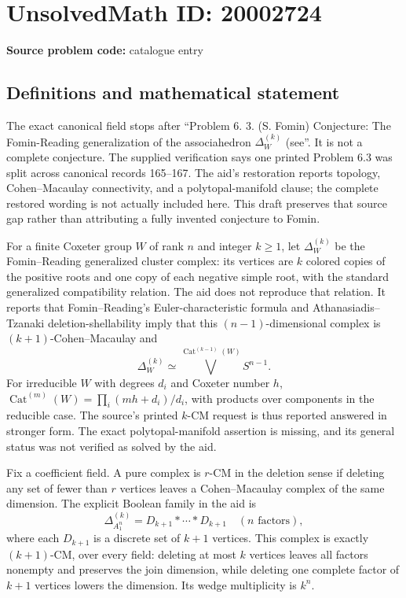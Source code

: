 \documentclass[11pt]{article}
\begin{document}
\section*{UnsolvedMath ID: 20002724}
\textbf{Source problem code:} catalogue entry
\subsection{Definitions and mathematical statement}
The exact canonical field stops after ``Problem 6. 3. (S. Fomin) Conjecture: The Fomin-Reading generalization of the associahedron \(\Delta_W^{(k)}\) (see''. It is not a complete conjecture. The supplied verification says one printed Problem 6.3 was split across canonical records 165--167. The aid's restoration reports topology, Cohen--Macaulay connectivity, and a polytopal-manifold clause; the complete restored wording is not actually included here. This draft preserves that source gap rather than attributing a fully invented conjecture to Fomin.

For a finite Coxeter group \(W\) of rank \(n\) and integer \(k\ge1\), let \(\Delta_W^{(k)}\) be the Fomin--Reading generalized cluster complex: its vertices are \(k\) colored copies of the positive roots and one copy of each negative simple root, with the standard generalized compatibility relation. The aid does not reproduce that relation. It reports that Fomin--Reading's Euler-characteristic formula and Athanasiadis--Tzanaki deletion-shellability imply that this \((n-1)\)-dimensional complex is \((k+1)\)-Cohen--Macaulay and
\[
 \Delta_W^{(k)}\simeq\bigvee^{\operatorname{Cat}^{(k-1)}(W)}S^{n-1}.
\]
For irreducible \(W\) with degrees \(d_i\) and Coxeter number \(h\), \(\operatorname{Cat}^{(m)}(W)=\prod_i(mh+d_i)/d_i\), with products over components in the reducible case. The source's printed \(k\)-CM request is thus reported answered in stronger form. The exact polytopal-manifold assertion is missing, and its general status was not verified as solved by the aid.

Fix a coefficient field. A pure complex is \(r\)-CM in the deletion sense if deleting any set of fewer than \(r\) vertices leaves a Cohen--Macaulay complex of the same dimension. The explicit Boolean family in the aid is
\[
 \Delta_{A_1^n}^{(k)}=D_{k+1}*\cdots*D_{k+1}\quad(n\text{ factors}),
\]
where each \(D_{k+1}\) is a discrete set of \(k+1\) vertices. This complex is exactly \((k+1)\)-CM, over every field: deleting at most \(k\) vertices leaves all factors nonempty and preserves the join dimension, while deleting one complete factor of \(k+1\) vertices lowers the dimension. Its wedge multiplicity is \(k^n\).
\end{document}
